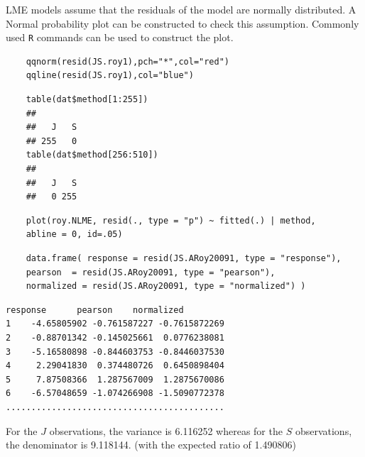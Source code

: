 \documentclass[a4paper,12pt]{article}
\begin{document}
LME models assume that the residuals of the model are normally distributed. A Normal probability plot can be constructed to check this assumption. Commonly used \texttt{R} commands can be used to construct the plot.


\begin{framed}
	\begin{verbatim}
	qqnorm(resid(JS.roy1),pch="*",col="red")
	qqline(resid(JS.roy1),col="blue")
	\end{verbatim}
\end{framed}

\begin{framed}
	\begin{verbatim}
	table(dat$method[1:255])
	## 
	##   J   S 
	## 255   0
	table(dat$method[256:510])
	## 
	##   J   S 
	##   0 255
	\end{verbatim}	
\end{framed}

\begin{framed}
	\begin{verbatim}
	plot(roy.NLME, resid(., type = "p") ~ fitted(.) | method, 
	abline = 0, id=.05)
	\end{verbatim}
\end{framed}





\begin{framed}
	\begin{verbatim}
	data.frame( response = resid(JS.ARoy20091, type = "response"), 
	pearson  = resid(JS.ARoy20091, type = "pearson"), 
	normalized = resid(JS.ARoy20091, type = "normalized") )
	\end{verbatim}
\end{framed}

\begin{verbatim}
response      pearson    normalized
1    -4.65805902 -0.761587227 -0.7615872269
2    -0.88701342 -0.145025661  0.0776238081
3    -5.16580898 -0.844603753 -0.8446037530
4     2.29041830  0.374480726  0.6450898404
5     7.87508366  1.287567009  1.2875670086
6    -6.57048659 -1.074266908 -1.5090772378
...........................................
\end{verbatim}
For the $J$ observations, the variance is 6.116252 whereas for the $S$ observations, the denominator is 9.118144. (with the expected ratio of  1.490806)
\end{document}
